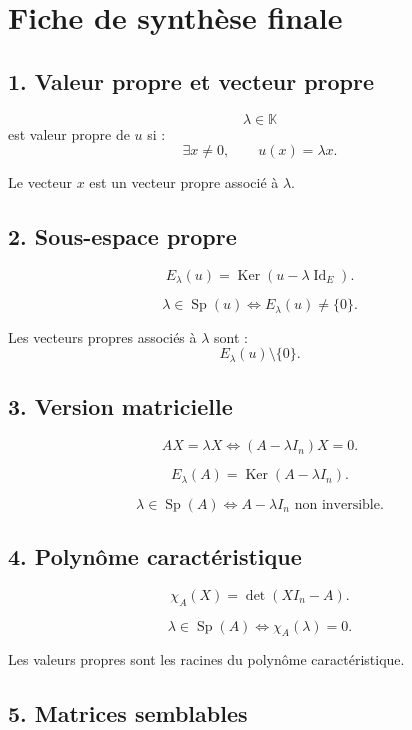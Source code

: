 \documentclass[11pt,a4paper]{article}
\newcommand{\K}{\mathbb K}
\newcommand{\Ker}{\operatorname{Ker}}
\newcommand{\Id}{\operatorname{Id}}
\newcommand{\Sp}{\operatorname{Sp}}
\begin{document}
\newpage
\section{Fiche de synthèse finale}

\subsection*{1. Valeur propre et vecteur propre}

\[
\lambda\in\K
\]
est valeur propre de \(u\) si :
\[
\exists x\neq0,\qquad u(x)=\lambda x.
\]

Le vecteur \(x\) est un vecteur propre associé à \(\lambda\).

\subsection*{2. Sous-espace propre}

\[
E_\lambda(u)=\Ker(u-\lambda\Id_E).
\]

\[
\lambda\in\Sp(u)
\Longleftrightarrow
E_\lambda(u)\neq\{0\}.
\]

Les vecteurs propres associés à \(\lambda\) sont :
\[
E_\lambda(u)\setminus\{0\}.
\]

\subsection*{3. Version matricielle}

\[
AX=\lambda X
\Longleftrightarrow
(A-\lambda I_n)X=0.
\]

\[
E_\lambda(A)=\Ker(A-\lambda I_n).
\]

\[
\lambda\in\Sp(A)
\Longleftrightarrow
A-\lambda I_n\text{ non inversible}.
\]

\subsection*{4. Polynôme caractéristique}

\[
\chi_A(X)=\det(XI_n-A).
\]

\[
\lambda\in\Sp(A)
\Longleftrightarrow
\chi_A(\lambda)=0.
\]

Les valeurs propres sont les racines du polynôme caractéristique.

\subsection*{5. Matrices semblables}
\end{document}
